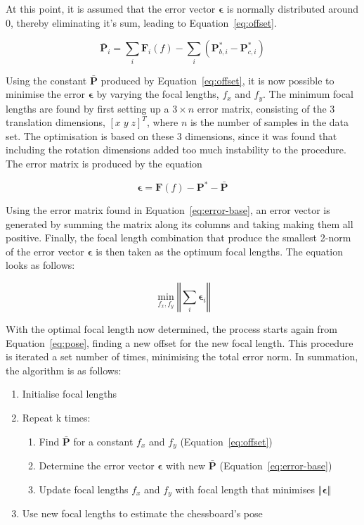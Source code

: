 At this point, it is assumed that the error vector $\bm{\epsilon}$ is normally distributed around $0$, thereby eliminating it's sum, leading to Equation~\ref{eq:offset}.

\begin{equation}
  \label{eq:offset}
  \bar{\bm{P}}_{i} = \sum\limits_i \bm{F}_i(f) - \sum\limits_i(\bm{P}^*_{b,i} - \bm{P}^*_{c, i})
\end{equation}

Using the constant $\bar{\bm{P}}$ produced by Equation~\ref{eq:offset}, it is now possible to minimise the error $\bm{\epsilon}$ by varying the focal lengths, $f_x$ and $f_y$. The minimum focal lengths are found by first setting up a $3\times n$ error matrix, consisting of the 3 translation dimensions, ${[x\;y\;z]}^T$, where $n$ is the number of samples in the data set. The optimisation is based on these 3 dimensions, since it was found that including the rotation dimensions added too much instability to the procedure. The error matrix is produced by the equation

\begin{equation}
  \label{eq:error-base}
  \bm{\epsilon} = \bm{F}(f) - \bm{P}^* - \bar{\bm{P}}
\end{equation}

Using the error matrix found in Equation~\ref{eq:error-base}, an error vector is generated by summing the matrix along its columns and taking making them all positive. Finally, the focal length combination that produce the smallest 2-norm of the error vector $\bm{\epsilon}$ is then taken as the optimum focal lengths. The equation looks as follows:

\[
  \min_{f_x, f_y}\left \Vert \sum_i  \bm{\epsilon}_i \right \Vert
\]

With the optimal focal length now determined, the process starts again from Equation~\ref{eq:pose}, finding a new offset for the new focal length. This procedure is iterated a set number of times, minimising the total error norm. In summation, the algorithm is as follows:

\begin{enumerate}
  \item Initialise focal lengths
  \item Repeat k times:
  \begin{enumerate}
    \item Find $\bar{\bm{P}}$ for a constant $f_x$ and $f_y$ (Equation~\ref{eq:offset})
      \item Determine the error vector $\bm{\epsilon}$ with new $\bar{\bm{P}}$ (Equation~\ref{eq:error-base})
    \item Update focal lengths $f_x$ and $f_y$ with focal length that minimises $\left \Vert \bm{\epsilon} \right \Vert$
  \end{enumerate}
  \item Use new focal lengths to estimate the chessboard's pose
\end{enumerate}

